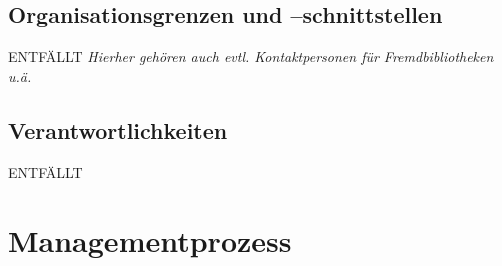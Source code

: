 \documentclass[fontsize=12pt,paper=a4,twoside]{scrartcl}
\begin{document}
\subsection{Organisationsgrenzen und --schnittstellen}
ENTFÄLLT
{\em Hierher gehören auch evtl. Kontaktpersonen für Fremdbibliotheken u.ä.}

\subsection{Verantwortlichkeiten}
ENTFÄLLT


\section{Managementprozess}
\end{document}
